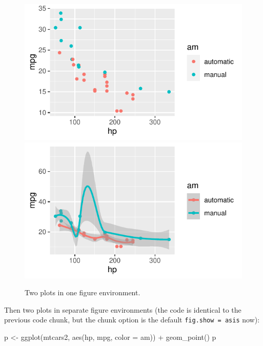 \documentclass[]{tufte-handout}
\newenvironment{Shaded}{}{}
\newcommand{\AttributeTok}[1]{\textcolor[rgb]{0.49,0.56,0.16}{#1}}
\newcommand{\FunctionTok}[1]{\textcolor[rgb]{0.02,0.16,0.49}{#1}}
\newcommand{\NormalTok}[1]{#1}
\newcommand{\OtherTok}[1]{\textcolor[rgb]{0.00,0.44,0.13}{#1}}
\newcommand{\SpecialCharTok}[1]{\textcolor[rgb]{0.25,0.44,0.63}{#1}}
\begin{document}
\begin{figure}
\includegraphics{tufte_files/figure-latex/fig-two-together-1} \includegraphics{tufte_files/figure-latex/fig-two-together-2} \caption[Two plots in one figure environment]{Two plots in one figure environment.}\label{fig:fig-two-together}
\end{figure}

Then two plots in separate figure environments (the code is identical to
the previous code chunk, but the chunk option is the default
\texttt{fig.show\ =\ \textquotesingle{}asis\textquotesingle{}} now):

\begin{Shaded}
\begin{Highlighting}[]
\NormalTok{p }\OtherTok{\textless{}{-}} \FunctionTok{ggplot}\NormalTok{(mtcars2, }\FunctionTok{aes}\NormalTok{(hp, mpg, }\AttributeTok{color =}\NormalTok{ am)) }\SpecialCharTok{+}
  \FunctionTok{geom\_point}\NormalTok{()}
\NormalTok{p}
\end{Highlighting}
\end{Shaded}
\end{document}
